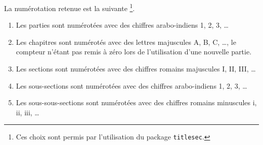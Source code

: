 La numérotation retenue est la suivante
\footnote{
	Ces choix sont permis par l'utilisation du package \texttt{titlesec}.
}.

\begin{enumerate}
	\item Les parties sont numérotées avec des chiffres arabo-indiens 1, 2, 3, \dots

	\item Les chapitres sont numérotés avec des lettres majuscules A, B, C, \dots , le compteur n'étant pas remis à zéro lors de l'utilisation d'une nouvelle partie.

	\item Les sections sont numérotées avec des chiffres romains majuscules I, II, III, \dots

	\item Les sous-sections sont numérotées avec des chiffres arabo-indiens 1, 2, 3, \dots

	\item Les sous-sous-sections sont numérotées avec des chiffres romains minuscules i, ii, iii, \dots
\end{enumerate}

